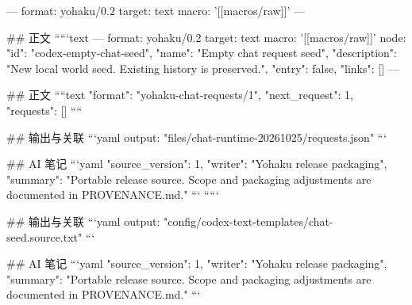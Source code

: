 ---
format: yohaku/0.2
target: text
macro: '[[macros/raw]]'
---

## 正文
`````text
---
format: yohaku/0.2
target: text
macro: '[[macros/raw]]'
node: {"id": "codex-empty-chat-seed", "name": "Empty chat request seed", "description": "New local world seed. Existing history is preserved.", "entry": false, "links": []}
---

## 正文
````text
{
  "format": "yohaku-chat-requests/1",
  "next_request": 1,
  "requests": []
}
````

## 输出与关联
```yaml
output: "files/chat-runtime-20261025/requests.json"
```

## AI 笔记
```yaml
{"source_version": 1, "writer": "Yohaku release packaging", "summary": "Portable release source. Scope and packaging adjustments are documented in PROVENANCE.md."}
```
`````

## 输出与关联
```yaml
output: "config/codex-text-templates/chat-seed.source.txt"
```

## AI 笔记
```yaml
{"source_version": 1, "writer": "Yohaku release packaging", "summary": "Portable release source. Scope and packaging adjustments are documented in PROVENANCE.md."}
```
